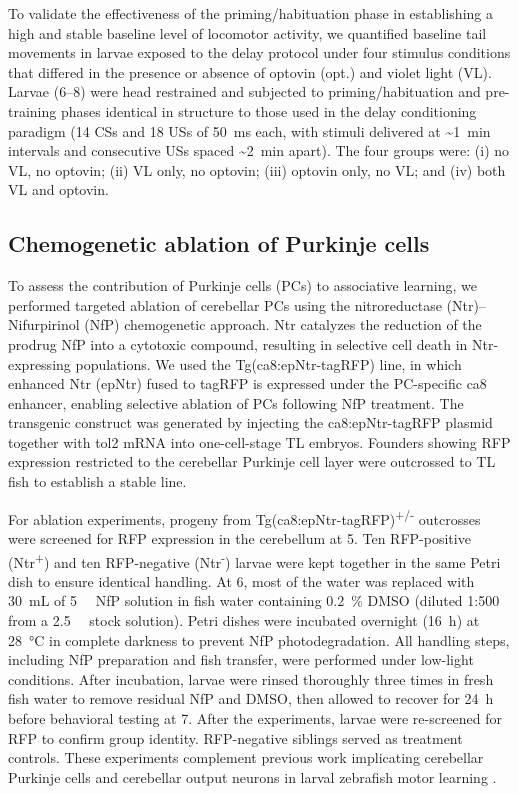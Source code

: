 To validate the effectiveness of the priming/habituation phase in establishing a high and stable baseline level of locomotor activity, we quantified baseline tail movements in larvae exposed to the delay protocol under four stimulus conditions that differed in the presence or absence of optovin (opt.) and violet light (VL). Larvae (\SIrange{6}{8}{\dpf}) were head restrained and subjected to priming/habituation and pre-training phases identical in structure to those used in the delay conditioning paradigm (14 CSs and 18 USs of \SI{50}{\milli\second} each, with stimuli delivered at \textasciitilde\SI{1}{\minute} intervals and consecutive USs spaced \textasciitilde\SI{2}{\minute} apart). The four groups were: (i) no VL, no optovin; (ii) VL only, no optovin; (iii) optovin only, no VL; and (iv) both VL and optovin.

\subsection{Chemogenetic ablation of Purkinje cells}

To assess the contribution of Purkinje cells (PCs) to associative learning, we performed targeted ablation of cerebellar PCs using the nitroreductase (Ntr)--Nifurpirinol (NfP) chemogenetic approach. Ntr catalyzes the reduction of the prodrug NfP into a cytotoxic compound, resulting in selective cell death in Ntr-expressing populations. We used the Tg(ca8:epNtr-tagRFP) line, in which enhanced Ntr (epNtr) fused to tagRFP is expressed under the PC-specific ca8 enhancer, enabling selective ablation of PCs following NfP treatment. The transgenic construct was generated by injecting the ca8:epNtr-tagRFP plasmid together with tol2 mRNA into one-cell-stage TL embryos. Founders showing RFP expression restricted to the cerebellar Purkinje cell layer were outcrossed to TL fish to establish a stable line.

For ablation experiments, progeny from Tg(ca8:epNtr-tagRFP)\textsuperscript{+/-} outcrosses were screened for RFP expression in the cerebellum at \SI{5}{\dpf}. Ten RFP-positive (Ntr\textsuperscript{+}) and ten RFP-negative (Ntr\textsuperscript{-}) larvae were kept together in the same Petri dish to ensure identical handling. At \SI{6}{\dpf}, most of the water was replaced with \SI{30}{\milli\liter} of \SI{5}{\micro\Molar} NfP solution in fish water containing \SI{0.2}{\percent} DMSO (diluted 1:500 from a \SI{2.5}{\milli\Molar} stock solution). Petri dishes were incubated overnight (\SI{16}{\hour}) at \SI{28}{\degreeCelsius} in complete darkness to prevent NfP photodegradation. All handling steps, including NfP preparation and fish transfer, were performed under low-light conditions. After incubation, larvae were rinsed thoroughly three times in fresh fish water to remove residual NfP and DMSO, then allowed to recover for \SI{24}{\hour} before behavioral testing at \SI{7}{\dpf}. After the experiments, larvae were re-screened for RFP to confirm group identity. RFP-negative siblings served as treatment controls. These experiments complement previous work implicating cerebellar Purkinje cells and cerebellar output neurons in larval zebrafish motor learning \citep{harmonDistinctResponsesPurkinje2017,najacSynapticVarianceAction2023}.

